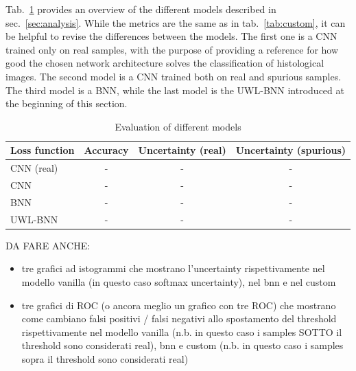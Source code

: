 \documentclass[11pt,twoside,a4paper]{article}
\begin{document}
Tab.~\ref{tab:colab} provides an overview of the different models described in sec.~\ref{sec:analysis}. While the metrics are the same as in tab.~\ref{tab:custom}, it can be helpful to revise the differences between the models. The first one is a CNN trained only on real samples, with the purpose of providing a reference for how good the chosen network architecture solves the classification of histological images.
The second model is a CNN trained both on real and spurious samples. The third model is a BNN, while the last model is the UWL-BNN introduced at the beginning of this section.


\begin{table}[!h]
  \begin{adjustwidth}{-.5in}{-.5in}
  \begin{center}
    \begin{tabular}{l | c | c | c}
      Loss function	& Accuracy	& Uncertainty (real)	& Uncertainty (spurious) \\
      \hline
      CNN (real)	& -		& - 			& - \\      
      CNN		& -		& - 			& - \\      
      BNN		& -		& - 			& - \\      
      UWL-BNN		& -		& - 			& - \\      
    \end{tabular}
    \caption{Evaluation of different models}
    \label{tab:colab}
  \end{center}
  \end{adjustwidth}
\end{table}

DA FARE ANCHE:
\begin{itemize}
\item tre grafici ad istogrammi che mostrano l'uncertainty rispettivamente nel modello vanilla (in questo caso softmax uncertainty), nel bnn e nel custom
\item tre grafici di ROC (o ancora meglio un grafico con tre ROC) che mostrano come cambiano falsi positivi / falsi negativi allo spostamento del threshold rispettivamente nel modello vanilla (n.b. in questo caso i samples SOTTO il threshold sono considerati real), bnn e custom (n.b. in questo caso i samples sopra il threshold sono considerati real)
\end{itemize}
\end{document}
